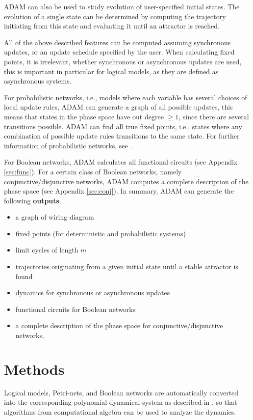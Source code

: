 \documentclass[11pt]{amsart}
\begin{document}
ADAM can also be used to study evolution of user-specified initial states. The evolution of a single state can be determined by computing the trajectory initiating from this state and evaluating it until an attractor is reached.
 
 
All of the above described features can be computed assuming synchronous updates, or an update schedule specified by the user. When calculating fixed points, it is irrelevant, whether synchronous or asynchronous updates are used, this is important in particular for logical models, as they are defined as asynchronous systems.
 
For probabilistic networks, i.e., models where each variable has several choices of local update rules, ADAM can generate a graph of all possible updates, this means that states in the phase space have out degree $\geq 1$, since there are several transitions possible. ADAM can find all true fixed points, i.e., states where any combination of possible update rules transitions to the same state. For further information of probabilistic networks, see \cite{shmulevich}.
 
For Boolean networks, ADAM calculates all functional circuits (see Appendix \ref{sec:func}). For a certain class of Boolean networks, namely conjunctive/disjunctive networks, ADAM computes a complete description of the phase space (see Appendix \ref{sec:conj}).
In summary, ADAM can generate the following {\bf outputs}.
\begin{itemize}
\item a graph of wiring diagram
\item fixed points (for deterministic and probabilistic systems)
\item limit cycles of length $m$
\item trajectories originating from a given initial state until a stable
attractor is found
\item dynamics for synchronous or asynchronous updates
\item functional circuits for Boolean networks
\item a complete description of the phase space for conjunctive/disjunctive
networks.
\end{itemize}
\section{Methods}
Logical models, Petri-nets, and Boolean networks are automatically converted
into the corresponding polynomial dynamical system as described in
\cite{Alan:Bioinf2010}, so that algorithms from computational
algebra can be used to analyze the dynamics.
 
\end{document}

